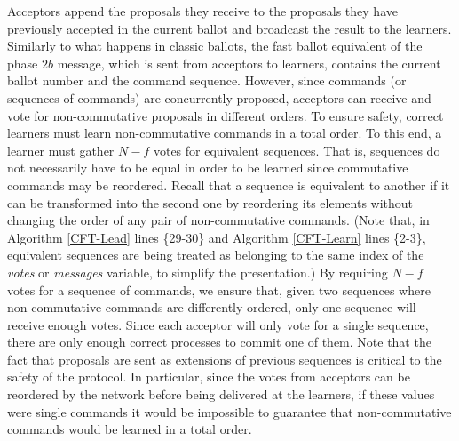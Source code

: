 Acceptors append the proposals they receive to the proposals they have previously accepted in the current ballot and broadcast the result to the learners. Similarly to what happens in classic ballots, the fast ballot equivalent of the phase $2b$ message, which is sent from acceptors to learners, contains the current ballot number and the command sequence. However, since commands (or sequences of commands) are concurrently proposed, acceptors can receive and vote for non-commutative proposals in different orders. To ensure safety, correct learners must learn non-commutative commands in a total order. To this end, a learner must gather $N-f$ votes for equivalent sequences. That is, sequences do not necessarily have to be equal in order to be learned since commutative commands may be reordered. Recall that a sequence is equivalent to another if it can be transformed into the second one by reordering its elements without changing the order of any pair of non-commutative commands. (Note that, in Algorithm \ref{CFT-Lead} lines \{29-30\} and Algorithm \ref{CFT-Learn} lines \{2-3\}, equivalent sequences are being treated as belonging to the same index of the \textit{votes} or \emph{messages} variable, to simplify the presentation.) By requiring $N-f$ votes for a sequence of commands, we ensure that, given two sequences where non-commutative commands are differently ordered, only one sequence will receive enough votes. Since each acceptor will only vote for a single sequence, there are only enough correct processes to commit one of them. Note that the fact that proposals are sent as extensions of previous sequences is critical to the safety of the protocol. In particular, since the votes from acceptors can be reordered by the network before being delivered at the learners, if these values were single commands it would be impossible to guarantee that non-commutative commands would be learned in a total order. \par

